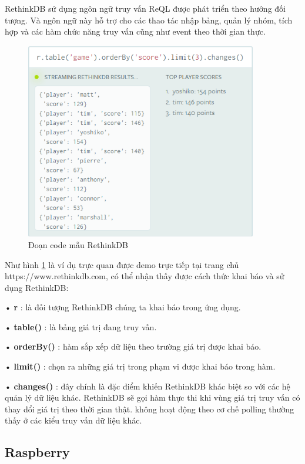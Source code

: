 RethinkDB sử dụng ngôn ngữ truy vấn ReQL được phát triển theo hướng đối tượng. Và ngôn ngữ này hỗ trợ cho các thao tác nhập bảng, quản lý nhóm, tích hợp và các hàm chức năng truy vấn cũng như event theo thời gian thực.

\begin{figure}[H]
	\centering    
	\includegraphics[width=0.9\textwidth]{rethink1}
	\caption[Đoạn code mẫu RethinkDB]{Đoạn code mẫu RethinkDB}
	\label{fig: rethink1}
\end{figure}

Như hình \ref{fig: rethink1} là ví dụ trực quan được demo trực tiếp tại trang chủ https://www.rethinkdb.com, có thể nhận thấy được cách thức khai báo và sử dụng RethinkDB:

• \textbf{r} : là đối tượng RethinkDB chúng ta khai báo trong ứng dụng.

• \textbf{table()} : là bảng giá trị đang truy vấn.

• \textbf{orderBy()} : hàm sắp xếp dữ liệu theo trường giá trị được khai báo.

• \textbf{limit()} : chọn ra những giá trị trong phạm vi được khai báo trong hàm.

• \textbf{changes()} : đây chính là đặc điểm khiến RethinkDB khác biệt so với các hệ quản lý dữ liệu khác. RethinkDB sẽ gọi hàm thực thi khi vùng giá trị truy vấn có thay dổi giá trị theo thời gian thật. không hoạt động theo cơ chế polling thường thấy ở các kiểu truy vấn dữ liệu khác.

\subsection{Raspberry}

